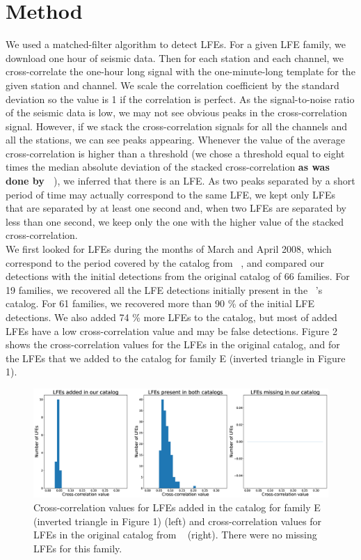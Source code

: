 \documentclass[draft]{agujournal2019}
\begin{document}
\section{Method}

We used a matched-filter algorithm to detect LFEs. For a given LFE family, we download one hour of seismic data. Then for each station and each channel, we cross-correlate the one-hour long signal with the one-minute-long template for the given station and channel. We scale the correlation coefficient by the standard deviation so the value is 1 if the correlation is perfect. As the signal-to-noise ratio of the seismic data is low, we may not see obvious peaks in the cross-correlation signal. However, if we stack the cross-correlation signals for all the channels and all the stations, we can see peaks appearing. Whenever the value of the average cross-correlation is higher than a threshold (we chose a threshold equal to eight times the median absolute deviation of the stacked cross-correlation \textbf{as was done by ~}), we inferred that there is an LFE. As two peaks separated by a short period of time may actually correspond to the same LFE, we kept only LFEs that are separated by at least one second and, when two LFEs are separated by less than one second, we keep only the one with the higher value of the stacked cross-correlation. \\

We first looked for LFEs during the months of March and April 2008, which correspond to the period covered by the catalog from ~, and compared our detections with the initial detections from the original catalog of 66 families. For 19 families, we recovered all the LFE detections initially present in the ~'s catalog. For 61 families, we recovered more than 90 \% of the initial LFE detections. We also added 74 \% more LFEs to the catalog, but most of added LFEs have a low cross-correlation value and may be false detections. Figure 2 shows the cross-correlation values for the LFEs in the original catalog, and for the LFEs that we added to the catalog for family E (inverted triangle in Figure 1). \\

\begin{figure}
\noindent\includegraphics[width=\textwidth, trim={7.5cm 1cm 28cm 2cm},clip]{figures/hist.eps}
\caption{Cross-correlation values for LFEs added in the catalog for family E (inverted triangle in Figure 1) (left) and cross-correlation values for LFEs in the original catalog from ~ (right). There were no missing LFEs for this family.}
\label{pngfiguresample}
\end{figure}
\end{document}
